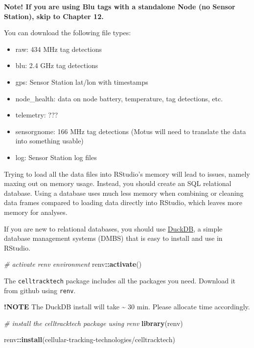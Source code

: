 \documentclass[
]{book}
\newenvironment{Shaded}{\begin{snugshade}}{\end{snugshade}}
\newcommand{\CommentTok}[1]{\textcolor[rgb]{0.56,0.35,0.01}{\textit{#1}}}
\newcommand{\FunctionTok}[1]{\textcolor[rgb]{0.13,0.29,0.53}{\textbf{#1}}}
\newcommand{\NormalTok}[1]{#1}
\newcommand{\SpecialCharTok}[1]{\textcolor[rgb]{0.81,0.36,0.00}{\textbf{#1}}}
\newcommand{\StringTok}[1]{\textcolor[rgb]{0.31,0.60,0.02}{#1}}
\providecommand{\tightlist}{%
  \setlength{\itemsep}{0pt}\setlength{\parskip}{0pt}}
\begin{document}
\textbf{Note! If you are using Blu tags with a standalone Node (no Sensor Station), skip to Chapter 12.}

You can download the following file types:

\begin{itemize}
\tightlist
\item
  raw: 434 MHz tag detections
\item
  blu: 2.4 GHz tag detections
\item
  gps: Sensor Station lat/lon with timestamps
\item
  node\_health: data on node battery, temperature, tag detections, etc.
\item
  telemetry: ???
\item
  sensorgnome: 166 MHz tag detections (Motus will need to translate the data into something usable)
\item
  log: Sensor Station log files
\end{itemize}

Trying to load all the data files into RStudio's memory will lead to issues, namely maxing out on memory usage. Instead, you should create an SQL relational database. Using a database uses much less memory when combining or cleaning data frames compared to loading data directly into RStudio, which leaves more memory for analyses.

If you are new to relational databases, you should use \href{https://duckdb.org/why_duckdb}{DuckDB}, a simple database management systems (DMBS) that is easy to install and use in RStudio.

\begin{Shaded}
\begin{Highlighting}[]
\CommentTok{\# activate renv environment}
\NormalTok{renv}\SpecialCharTok{::}\FunctionTok{activate}\NormalTok{()}
\end{Highlighting}
\end{Shaded}

The \texttt{celltracktech} package includes all the packages you need. Download it from github using \texttt{renv}.

\textbf{!NOTE} The DuckDB install will take \textasciitilde{} 30 min. Please allocate time accordingly.

\begin{Shaded}
\begin{Highlighting}[]
\CommentTok{\# install the celltracktech package using renv}
\FunctionTok{library}\NormalTok{(renv)}

\NormalTok{renv}\SpecialCharTok{::}\FunctionTok{install}\NormalTok{(}\StringTok{\textquotesingle{}cellular{-}tracking{-}technologies/celltracktech\textquotesingle{}}\NormalTok{)}
\end{Highlighting}
\end{Shaded}
\end{document}
